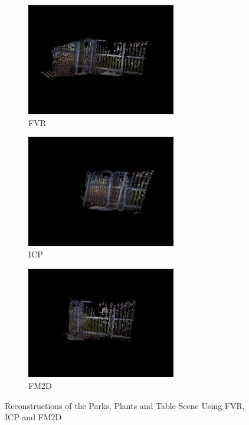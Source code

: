 \begin{figure}[!h] 
        \centering
        \begin{subfigure}[b]{6.8cm}
                \includegraphics[width=6.5cm]{images/results/qualitative_fvr_sota/plants_outdoors_FVR}
                \caption{FVR}
                \label{fig:qualrecon2FVR}
        \end{subfigure}%
        \begin{subfigure}[b]{6.8cm}
                \includegraphics[width=6.5cm]{images/results/qualitative_fvr_sota/plants_outdoors_ICP}
                \caption{ICP}
                \label{fig:qualrecon2ICP}
        \end{subfigure}
        \begin{subfigure}[b]{6.8cm}
                \includegraphics[width=6.5cm]{images/results/qualitative_fvr_sota/plants_outdoors_FM2D}
                \caption{FM2D}
                \label{fig:qualrecon2FM2D}
        \end{subfigure}
       \caption{Reconstructions of the Parks, Plants and Table Scene Using FVR, ICP and FM2D.}
       \label{fig:QualReconstructions2}
\end{figure}

